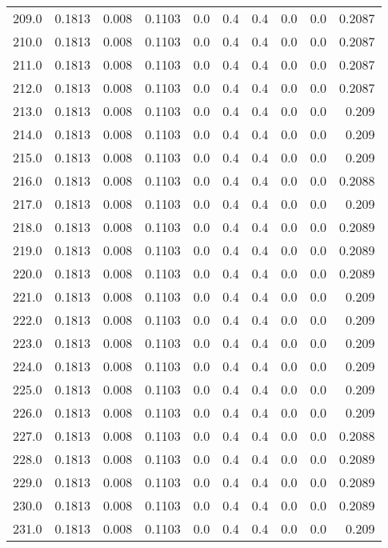 \begin{longtable}{lrrrrrrrrr}
209.0 & 0.1813 & 0.008 & 0.1103 & 0.0 & 0.4 & 0.4 & 0.0 & 0.0 & 0.2087 \\
210.0 & 0.1813 & 0.008 & 0.1103 & 0.0 & 0.4 & 0.4 & 0.0 & 0.0 & 0.2087 \\
211.0 & 0.1813 & 0.008 & 0.1103 & 0.0 & 0.4 & 0.4 & 0.0 & 0.0 & 0.2087 \\
212.0 & 0.1813 & 0.008 & 0.1103 & 0.0 & 0.4 & 0.4 & 0.0 & 0.0 & 0.2087 \\
213.0 & 0.1813 & 0.008 & 0.1103 & 0.0 & 0.4 & 0.4 & 0.0 & 0.0 & 0.209 \\
214.0 & 0.1813 & 0.008 & 0.1103 & 0.0 & 0.4 & 0.4 & 0.0 & 0.0 & 0.209 \\
215.0 & 0.1813 & 0.008 & 0.1103 & 0.0 & 0.4 & 0.4 & 0.0 & 0.0 & 0.209 \\
216.0 & 0.1813 & 0.008 & 0.1103 & 0.0 & 0.4 & 0.4 & 0.0 & 0.0 & 0.2088 \\
217.0 & 0.1813 & 0.008 & 0.1103 & 0.0 & 0.4 & 0.4 & 0.0 & 0.0 & 0.209 \\
218.0 & 0.1813 & 0.008 & 0.1103 & 0.0 & 0.4 & 0.4 & 0.0 & 0.0 & 0.2089 \\
219.0 & 0.1813 & 0.008 & 0.1103 & 0.0 & 0.4 & 0.4 & 0.0 & 0.0 & 0.2089 \\
220.0 & 0.1813 & 0.008 & 0.1103 & 0.0 & 0.4 & 0.4 & 0.0 & 0.0 & 0.2089 \\
221.0 & 0.1813 & 0.008 & 0.1103 & 0.0 & 0.4 & 0.4 & 0.0 & 0.0 & 0.209 \\
222.0 & 0.1813 & 0.008 & 0.1103 & 0.0 & 0.4 & 0.4 & 0.0 & 0.0 & 0.209 \\
223.0 & 0.1813 & 0.008 & 0.1103 & 0.0 & 0.4 & 0.4 & 0.0 & 0.0 & 0.209 \\
224.0 & 0.1813 & 0.008 & 0.1103 & 0.0 & 0.4 & 0.4 & 0.0 & 0.0 & 0.209 \\
225.0 & 0.1813 & 0.008 & 0.1103 & 0.0 & 0.4 & 0.4 & 0.0 & 0.0 & 0.209 \\
226.0 & 0.1813 & 0.008 & 0.1103 & 0.0 & 0.4 & 0.4 & 0.0 & 0.0 & 0.209 \\
227.0 & 0.1813 & 0.008 & 0.1103 & 0.0 & 0.4 & 0.4 & 0.0 & 0.0 & 0.2088 \\
228.0 & 0.1813 & 0.008 & 0.1103 & 0.0 & 0.4 & 0.4 & 0.0 & 0.0 & 0.2089 \\
229.0 & 0.1813 & 0.008 & 0.1103 & 0.0 & 0.4 & 0.4 & 0.0 & 0.0 & 0.2089 \\
230.0 & 0.1813 & 0.008 & 0.1103 & 0.0 & 0.4 & 0.4 & 0.0 & 0.0 & 0.2089 \\
231.0 & 0.1813 & 0.008 & 0.1103 & 0.0 & 0.4 & 0.4 & 0.0 & 0.0 & 0.209 \\

\end{longtable}
